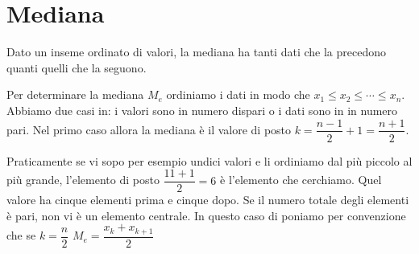 \section{Mediana}
\begin{defn}[Mediana]
	Dato un inseme ordinato di valori, la mediana  ha tanti dati che la precedono quanti quelli che la seguono.
\end{defn}
Per determinare la mediana $M_e$ ordiniamo i dati in modo che $x_1\leq x_2\leq\cdots\leq x_n $. Abbiamo due casi in: i valori sono in numero dispari o i dati sono in in numero pari. Nel primo caso allora la mediana è il valore di posto $k=\dfrac{n-1}{2}+1=\dfrac{n+1}{2}$. 

Praticamente se vi sopo per esempio undici valori e li ordiniamo dal più piccolo al più grande, l'elemento di posto $ \dfrac{11+1}{2}=6$ è l'elemento che cerchiamo. Quel valore ha cinque elementi prima e cinque dopo. Se il numero totale  degli elementi è pari, non vi è un elemento centrale. In questo caso di poniamo  per convenzione che se $k=\dfrac{n}{2}$ $M_e=\dfrac{x_k+x_{k+1}}{2}$

